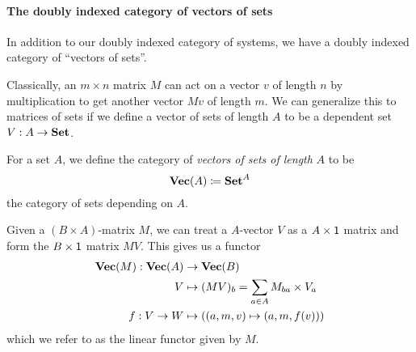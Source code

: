 \documentclass[DynamicalBook]{subfiles}
\begin{document}
\paragraph{The doubly indexed category of vectors of sets}

In addition to our doubly indexed category of systems, we have a doubly indexed
category of ``vectors of sets''. 

Classically, an $m \times n$ matrix $M$ can act on a vector $v$ of length $n$ by multiplication to get
another vector $Mv$ of length $m$. We can generalize this to matrices of sets if
we define a vector of sets of length $A$ to be a dependent set $V : A \to
\textbf{Set}$. 
\begin{definition}\label{def.linear_functor}
  For a set $A$, we define the category of \emph{vectors of sets of length} $A$
  to be $$\textbf{Vec}(A) \coloneqq \textbf{Set}^A$$
the category of sets depending on $A$. 

Given a $(B \times A)$-matrix $M$, we can treat a $A$-vector $V$ as a $A \times
\mathsf{1}$ matrix and form the $B \times \mathsf{1}$ matrix $MV$. This gives us a
functor
\begin{align*}
\textbf{Vec}(M) : \textbf{Vec}(A) &\to \textbf{Vec}(B)\\
               V &\mapsto (MV)_b = \sum_{a \in A} M_{ba} \times V_a \\
           f : V \to W &\mapsto ( (a, m, v) \mapsto (a, m, f(v)) )
\end{align*}
which we refer to as the linear functor given by $M$.
\end{definition}
\end{document}
